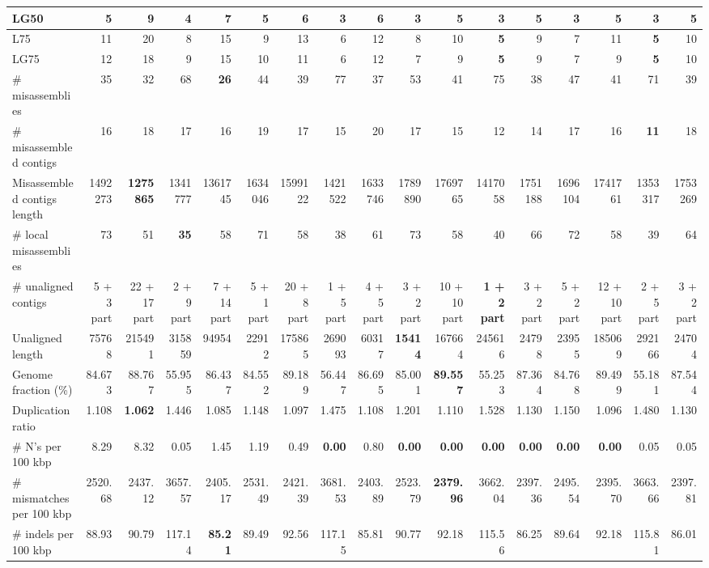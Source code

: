 \documentclass[12pt,a4paper]{article}
\begin{document}
\begin{table}[ht]
\begin{center}
\begin{tabular}{|l*{16}{|r}|}
LG50 & 5 & 9 & 4 & 7 & 5 & 6 & {\bf 3} & 6 & {\bf 3} & 5 & {\bf 3} & 5 & {\bf 3} & 5 & {\bf 3} & 5 \\ \hline
L75 & 11 & 20 & 8 & 15 & 9 & 13 & 6 & 12 & 8 & 10 & {\bf 5} & 9 & 7 & 11 & {\bf 5} & 10 \\ \hline
LG75 & 12 & 18 & 9 & 15 & 10 & 11 & 6 & 12 & 7 & 9 & {\bf 5} & 9 & 7 & 9 & {\bf 5} & 10 \\ \hline
\# misassemblies & 35 & 32 & 68 & {\bf 26} & 44 & 39 & 77 & 37 & 53 & 41 & 75 & 38 & 47 & 41 & 71 & 39 \\ \hline
\# misassembled contigs & 16 & 18 & 17 & 16 & 19 & 17 & 15 & 20 & 17 & 15 & 12 & 14 & 17 & 16 & {\bf 11} & 18 \\ \hline
Misassembled contigs length & 1492273 & {\bf 1275865} & 1341777 & 1361745 & 1634046 & 1599122 & 1421522 & 1633746 & 1789890 & 1769765 & 1417058 & 1751188 & 1696104 & 1741761 & 1353317 & 1753269 \\ \hline
\# local misassemblies & 73 & 51 & {\bf 35} & 58 & 71 & 58 & 38 & 61 & 73 & 58 & 40 & 66 & 72 & 58 & 39 & 64 \\ \hline
\# unaligned contigs & 5 + 3 part & 22 + 17 part & 2 + 9 part & 7 + 14 part & 5 + 1 part & 20 + 8 part & 1 + 5 part & 4 + 5 part & 3 + 2 part & 10 + 10 part & {\bf 1 + 2 part} & 3 + 2 part & 5 + 2 part & 12 + 10 part & 2 + 5 part & 3 + 2 part \\ \hline
Unaligned length & 75768 & 215491 & 315859 & 94954 & 22912 & 175865 & 269093 & 60317 & {\bf 15414} & 167664 & 245616 & 24798 & 23955 & 185069 & 292166 & 24704 \\ \hline
Genome fraction (\%) & 84.673 & 88.767 & 55.955 & 86.437 & 84.552 & 89.189 & 56.447 & 86.695 & 85.001 & {\bf 89.557} & 55.253 & 87.364 & 84.768 & 89.499 & 55.181 & 87.544 \\ \hline
Duplication ratio & 1.108 & {\bf 1.062} & 1.446 & 1.085 & 1.148 & 1.097 & 1.475 & 1.108 & 1.201 & 1.110 & 1.528 & 1.130 & 1.150 & 1.096 & 1.480 & 1.130 \\ \hline
\# N's per 100 kbp & 8.29 & 8.32 & 0.05 & 1.45 & 1.19 & 0.49 & {\bf 0.00} & 0.80 & {\bf 0.00} & {\bf 0.00} & {\bf 0.00} & {\bf 0.00} & {\bf 0.00} & {\bf 0.00} & 0.05 & 0.05 \\ \hline
\# mismatches per 100 kbp & 2520.68 & 2437.12 & 3657.57 & 2405.17 & 2531.49 & 2421.39 & 3681.53 & 2403.89 & 2523.79 & {\bf 2379.96} & 3662.04 & 2397.36 & 2495.54 & 2395.70 & 3663.66 & 2397.81 \\ \hline
\# indels per 100 kbp & 88.93 & 90.79 & 117.14 & {\bf 85.21} & 89.49 & 92.56 & 117.15 & 85.81 & 90.77 & 92.18 & 115.56 & 86.25 & 89.64 & 92.18 & 115.81 & 86.01 \\ \hline

\end{tabular}
\end{center}
\end{table}
\end{document}
